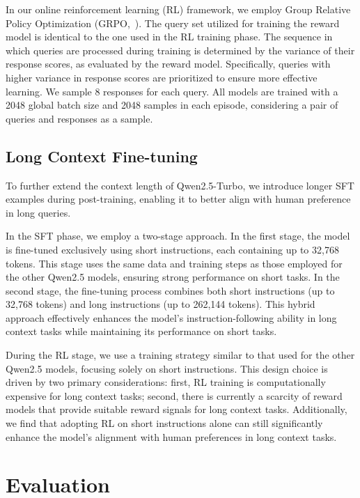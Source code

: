 \documentclass{article}
\begin{document}
In our online reinforcement learning (RL) framework, we employ Group Relative Policy Optimization (GRPO,~\citealp{deepseekmath}). The query set utilized for training the reward model is identical to the one used in the RL training phase. The sequence in which queries are processed during training is determined by the variance of their response scores, as evaluated by the reward model. Specifically, queries with higher variance in response scores are prioritized to ensure more effective learning.
We sample 8 responses for each query. All models are trained with a 2048 global batch size and 2048 samples in each episode, considering a pair of queries and responses as a sample. 

\subsection{Long Context Fine-tuning}

To further extend the context length of Qwen2.5-Turbo, we introduce longer SFT examples during post-training, enabling it to better align with human preference in long queries.

In the SFT phase, we employ a two-stage approach. In the first stage, the model is fine-tuned exclusively using short instructions, each containing up to 32,768 tokens. This stage uses the same data and training steps as those employed for the other Qwen2.5 models, ensuring strong performance on short tasks. In the second stage, the fine-tuning process combines both short instructions (up to 32,768 tokens) and long instructions (up to 262,144 tokens). This hybrid approach effectively enhances the model's instruction-following ability in long context tasks while maintaining its performance on short tasks.

During the RL stage, we use a training strategy similar to that used for the other Qwen2.5 models, focusing solely on short instructions. This design choice is driven by two primary considerations: first, RL training is computationally expensive for long context tasks; second, there is currently a scarcity of reward models that provide suitable reward signals for long context tasks. Additionally, we find that adopting RL on short instructions alone can still significantly enhance the model's alignment with human preferences in long context tasks.

\section{Evaluation}
\label{sec:experiment}
\end{document}

